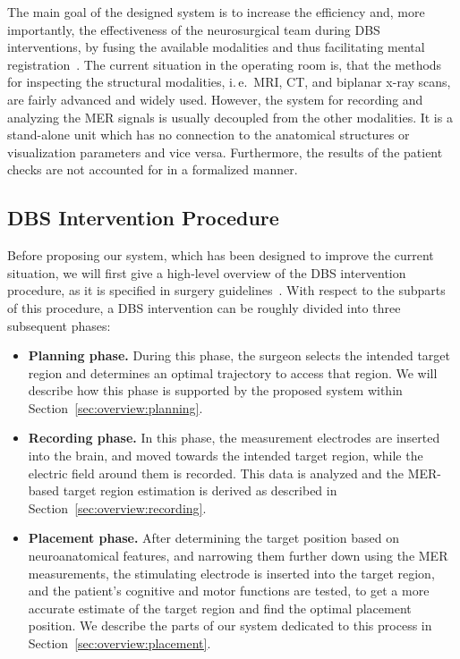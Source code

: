 \documentclass[journal]{vgtc}                %
\begin{document}
The main goal of the designed system is to increase the efficiency and, more importantly, the effectiveness of the neurosurgical team during DBS interventions, by fusing the available modalities and thus facilitating mental registration~\cite{Tory1998}. The current situation in the operating room is, that the methods for inspecting the structural modalities, i.\,e.~MRI, CT, and biplanar x-ray scans, are fairly advanced and widely used. However, the system for recording and analyzing the MER signals is usually decoupled from the other modalities. It is a stand-alone unit which has no connection to the anatomical structures or visualization parameters and vice versa. Furthermore, the results of the patient checks are not accounted for in a formalized manner.


\subsection{DBS Intervention Procedure}\label{sec:overview:procedure}
Before proposing our system, which has been designed to improve the current situation, we will first give a high-level overview of the DBS intervention procedure, as it is specified in surgery guidelines~\cite{Hemm2010}. With respect to the subparts of this procedure, a DBS intervention can be roughly divided into three subsequent phases:

\begin{itemize}
\item \textbf{Planning phase.} During this phase, the surgeon selects the intended target region and determines an optimal trajectory to access that region. We will describe how this phase is supported by the proposed system within Section~\ref{sec:overview:planning}.
\item \textbf{Recording phase.} In this phase, the measurement electrodes are inserted into the brain, and moved towards the intended target region, while the electric field around them is recorded. This data is analyzed and the MER-based target region estimation is derived as described in Section~\ref{sec:overview:recording}.
\item \textbf{Placement phase.} After determining the target position based on neuroanatomical features, and narrowing them further down using the MER measurements, the stimulating electrode is inserted into the target region, and the patient's cognitive and motor functions are tested, to get a more accurate estimate of the target region and find the optimal placement position. We describe the parts of our system dedicated to this process in Section~\ref{sec:overview:placement}.
\end{itemize}
\end{document}
